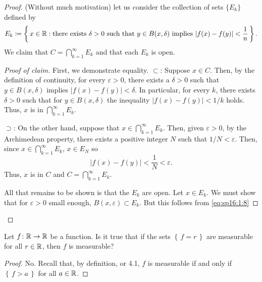 \begin{proof}
(Without much motivation) let us consider the collection of sets $\{E_k\}$
defined by
\begin{equation}
\label{eq:sp16:1:8}
E_k\coloneqq\left\{\,x\in\mathbb{R}:
\text{there exists $\delta>0$ such that $y\in B(x,\delta)$ implies $\left|f(x)-f(y)\right|<\frac{1}{n}$}\,\right\}.
\end{equation}
We claim that $C=\bigcap_{k=1}^\infty E_k$ and that each $E_k$ is open.
\begin{proof}[Proof of claim]
\renewcommand{\qedsymbol}{$\clubsuit$}
First, we demonstrate equality. $\subset$: Suppose $x\in C$. Then, by the
definition of continuity, for every $\varepsilon>0$, there exists a
$\delta>0$ such that $y\in B(x,\delta)$ implies $|f(x)-f(y)|<\delta$. In
particular, for every $k$, there exists $\delta>0$ such that for $y\in
B(x,\delta)$ the inequality $|f(x)-f(y)|<1/k$ holds. Thus, $x$ is in
$\bigcap_{k=1}^\infty E_k$.

$\supset$: On the other hand, suppose that $x\in\bigcap_{k=1}^\infty
E_k$. Then, given $\varepsilon>0$, by the Archimedean property, there
exists a positive integer $N$ such that $1/N<\varepsilon$. Then, since
$x\in\bigcap_{k=1}^\infty E_k$, $x\in E_N$ so
\begin{equation}
  \label{eq:sp16:1:9}
|f(x)-f(y)|<\frac{1}{N}<\varepsilon.
\end{equation}
Thus, $x$ is in $C$ and $C=\bigcap_{k=1}^\infty E_k$.

All that remains to be shown is that the $E_k$ are open. Let $x\in E_k$. We
must show that for $\varepsilon>0$ small enough, $B(x,\varepsilon)\subset
E_k$. But this follows from \eqref{eq:sp16:1:8}
\end{proof}
\end{proof}
\begin{problem}
Let $f\colon\mathbb{R}\to\mathbb{R}$ be a function. Is it true that if the sets
$\left\{\,f=r\,\right\}$ are measurable for all $r\in\mathbb{R}$, then $f$ is
measurable?
\end{problem}
\begin{proof}
No. Recall that, by definition, or 4.1, $f$ is measurable if and only if
$\left\{\,f>a\,\right\}$ for all $a\in\mathbb{R}$.
\end{proof}

